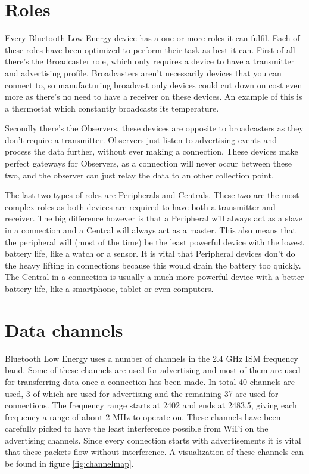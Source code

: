\documentclass[pdftex,a4paper,12pt,twoside]{report}
\begin{document}
\newpage{}

\section{Roles}
\label{sec:roles}
Every Bluetooth Low Energy device has a one or more roles it can fulfil. Each of these roles have been optimized to perform their task as best it can. First of all there's the Broadcaster role, which only requires a device to have a transmitter and advertising profile. Broadcasters aren't necessarily devices that you can connect to, so manufacturing broadcast only devices could cut down on cost even more as there's no need to have a receiver on these devices. An example of this is a thermostat which constantly broadcasts its temperature.

Secondly there's the Observers, these devices are opposite to broadcasters as they don't require a transmitter. Observers just listen to advertising events and process the data further, without ever making a connection. These devices make perfect gateways for Observers, as a connection will never occur between these two, and the observer can just relay the data to an other collection point.

The last two types of roles are Peripherals and Centrals. These two are the most complex roles as both devices are required to have both a transmitter and receiver. The big difference however is that a Peripheral will always act as a slave in a connection and a Central will always act as a master. This also means that the peripheral will (most of the time) be the least powerful device with the lowest battery life, like a watch or a sensor. It is vital that Peripheral devices don't do the heavy lifting in connections because this would drain the battery too quickly. The Central in a connection is usually a much more powerful device with a better battery life, like a smartphone, tablet or even computers.

\section{Data channels}
\label{sec:channels}
Bluetooth Low Energy uses a number of channels in the 2.4 GHz ISM frequency band. Some of these channels are used for advertising and most of them are used for transferring data once a connection has been made. In total 40 channels are used, 3 of which are used for advertising and the remaining 37 are used for connections. The frequency range starts at 2402 and ends at 2483.5, giving each frequency a range of about 2 MHz to operate on. These channels have been carefully picked to have the least interference possible from WiFi on the advertising channels. Since every connection starts with advertisements it is vital that these packets flow without interference. A visualization of these channels can be found in figure \ref{fig:channelmap}.
\end{document}
